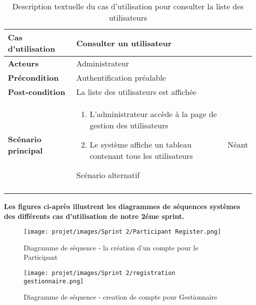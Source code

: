 \renewcommand{\arraystretch}{1.4} %
\begin{longtable}{|>{\bfseries}p{3.5cm}|p{9cm}|}
\hline
Cas d’utilisation & Consulter un utilisateur \\
\hline
Acteurs & Administrateur \\
\hline
Précondition & Authentification préalable \\
\hline
Post-condition & La liste des utilisateurs est affichée \\
\hline
Scénario principal & 
\begin{enumerate}
  \item L’administrateur accède à la page de gestion des utilisateurs
  \item Le système affiche un tableau contenant tous les utilisateurs
\end{enumerate} 
\hline
Scénario alternatif & Néant \\
\hline
\caption{Description textuelle du cas d’utilisation pour consulter la liste des utilisateurs}
\end{longtable}



\textbf{Les figures ci-après illustrent les diagrammes de séquences systèmes des différents cas d’utilisation de notre 2éme sprint.}

\begin{figure}[H]
    \centering
    \texttt{[image: projet/images/Sprint 2/Participant Register.png]}
    \caption{Diagramme de séquence - la création d'un compte pour le Participant}
    \label{fig:equipe_scrum}
\end{figure}
\begin{figure}[H]
    \centering
    \texttt{[image: projet/images/Sprint 2/registration gestionnaire.png]}
    \caption{Diagramme de séquence - creation de compte pour Gestionnaire }
    \label{fig:equipe_scrum}
\end{figure}


